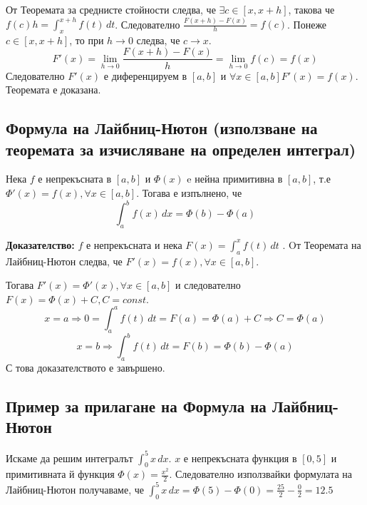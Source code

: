 \documentclass[fleqn,12pt]{article}
\begin{document}
От Теоремата за среднисте стойности следва, че $\exists c \in [x,x+h]$, такова че $f(c)h = \int_{x}^{x+h} f(t)\,dt$.
Следователно $\frac{F(x+h)-F(x)}{h} = f(c)$. Понеже $c \in [x,x+h]$, то при $h \rightarrow 0$ следва, че $c \rightarrow x$.
\[ F'(x) = \lim_{h \rightarrow 0} \frac{F(x+h)-F(x)}{h} = \lim_{h \rightarrow 0} f(c) = f(x) \] 
Следователно $F'(x)$ е диференцируем в $[a,b]$ и $\forall x \in [a,b] F'(x)=f(x)$.
Теоремата е доказана.

\subsection{Формула на Лайбниц-Нютон (използване на теоремата за изчисляване на определен интеграл)}
Нека $f$ е непрекъсната в $[a,b]$ и $\Phi(x)$ e нейна примитивна в $[a,b]$, т.е $\Phi'(x)=f(x), \forall x \in [a,b]$. 
Тогава е изпълнено, че
\[\int_{a}^{b} f(x)\,dx = \Phi(b) - \Phi(a) \]

\textbf{Доказателство: } $f$ е непрекъсната и нека $F(x)=\int_{a}^{x} f(t)\,dt$ . Oт Теоремата на Лайбниц-Нютон следва, че $F'(x)=f(x), \forall x \in [a,b]$.

Тогава $F'(x)=\Phi'(x), \forall x \in [a,b]$ и следователно $F(x) = \Phi(x) + C, C = const$.
\[ x = a \Rightarrow 0 = \int_{a}^{a} f(t)\,dt = F(a) = \Phi(a) + C \Rightarrow C = \Phi(a) \]
\[ x = b \Rightarrow \int_{a}^{b} f(t)\,dt = F(b) = \Phi(b) - \Phi(a) \] 
С това доказателството е завършено.

\subsection{Пример за прилагане на Формула на Лайбниц-Нютон}
Искаме да решим интегралът $\int_{0}^{5} x\,dx$. $x$ е непрекъсната функция в $[0,5]$ и примитивната й функция $\Phi(x)=\frac{x^2}{2}$.
Следователно използвайки формулата на Лайбниц-Нютон получаваме, че $\int_{0}^{5} x\,dx = \Phi(5) - \Phi(0) = \frac{25}{2} - \frac{0}{2} = 12.5$
\end{document}
